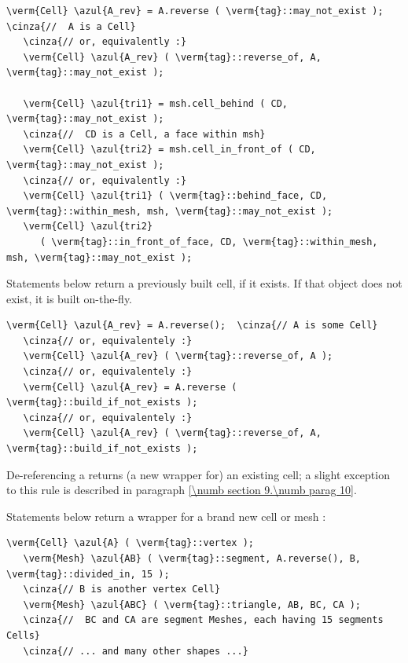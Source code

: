 \begin{Verbatim}[commandchars=\\\{\},formatcom=\small\tt,
   baselinestretch=0.94,framesep=2mm                      ]
   \verm{Cell} \azul{A_rev} = A.reverse ( \verm{tag}::may_not_exist );  \cinza{//  A is a Cell}
   \cinza{// or, equivalently :}
   \verm{Cell} \azul{A_rev} ( \verm{tag}::reverse_of, A, \verm{tag}::may_not_exist );
   
   \verm{Cell} \azul{tri1} = msh.cell_behind ( CD, \verm{tag}::may_not_exist );
   \cinza{//  CD is a Cell, a face within msh}
   \verm{Cell} \azul{tri2} = msh.cell_in_front_of ( CD, \verm{tag}::may_not_exist );
   \cinza{// or, equivalently :}
   \verm{Cell} \azul{tri1} ( \verm{tag}::behind_face, CD, \verm{tag}::within_mesh, msh, \verm{tag}::may_not_exist );
   \verm{Cell} \azul{tri2}
      ( \verm{tag}::in_front_of_face, CD, \verm{tag}::within_mesh, msh, \verm{tag}::may_not_exist );
\end{Verbatim}

Statements below return a previously built cell, if it exists.
If that object does not exist, it is built on-the-fly.

\begin{Verbatim}[commandchars=\\\{\},formatcom=\small\tt,
   baselinestretch=0.94,framesep=2mm                      ]
   \verm{Cell} \azul{A_rev} = A.reverse();  \cinza{// A is some Cell}
   \cinza{// or, equivalentely :}
   \verm{Cell} \azul{A_rev} ( \verm{tag}::reverse_of, A );
   \cinza{// or, equivalentely :}
   \verm{Cell} \azul{A_rev} = A.reverse ( \verm{tag}::build_if_not_exists );
   \cinza{// or, equivalentely :}
   \verm{Cell} \azul{A_rev} ( \verm{tag}::reverse_of, A, \verm{tag}::build_if_not_exists );
\end{Verbatim}

De-referencing a {\small\tt{}} returns (a new wrapper for) an existing cell;
a slight exception to this rule is described in paragraph \ref{\numb section 9.\numb parag 10}.

Statements below return a wrapper for a brand new cell or mesh :

\begin{Verbatim}[commandchars=\\\{\},formatcom=\small\tt,
   baselinestretch=0.94,framesep=2mm                      ]
   \verm{Cell} \azul{A} ( \verm{tag}::vertex );
   \verm{Mesh} \azul{AB} ( \verm{tag}::segment, A.reverse(), B, \verm{tag}::divided_in, 15 );
   \cinza{// B is another vertex Cell}
   \verm{Mesh} \azul{ABC} ( \verm{tag}::triangle, AB, BC, CA );
   \cinza{//  BC and CA are segment Meshes, each having 15 segments Cells}
   \cinza{// ... and many other shapes ...}
\end{Verbatim}



